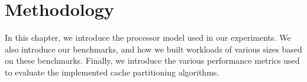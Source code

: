 
\chapter{Methodology}
\label{cpt:methodology}

In this chapter, we introduce the processor model used in our experiments.
We also introduce our benchmarks, and how we built workloads of various sizes based on these benchmarks.
Finally, we introduce the various performance metrics used to evaluate the implemented cache partitioning algorithms.






